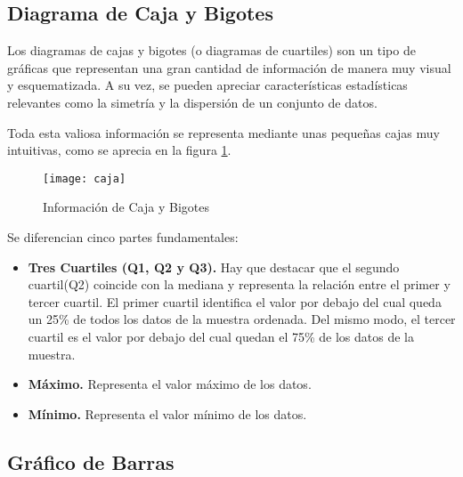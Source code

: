 \subsection{Diagrama de Caja y Bigotes}
Los diagramas de cajas y bigotes (o diagramas de cuartiles) son un tipo de gráficas que representan una gran cantidad de información de manera muy visual y esquematizada. A su vez, se pueden apreciar características estadísticas relevantes como la simetría y la dispersión de un conjunto de datos.

Toda esta valiosa información se representa mediante unas pequeñas cajas muy intuitivas, como se aprecia en la figura \ref{fig:caja}.

	
	\begin{figure}%
		\centering
		\texttt{[image: caja]}
		\caption{Información de Caja y Bigotes}\label{fig:caja}
	\end{figure}
	
Se diferencian cinco partes fundamentales: 
\begin{itemize}
	\item 
	\textbf{Tres Cuartiles (Q1, Q2 y Q3).} Hay que destacar que el segundo cuartil(Q2) coincide con la mediana y representa la relación entre el primer y tercer cuartil. El primer cuartil identifica el valor por debajo del cual queda un 25\% de todos los datos de la muestra ordenada. Del mismo modo, el tercer cuartil es el valor por debajo del cual quedan el 75\% de los datos de la muestra.
	\item 
	\textbf{Máximo.} Representa el valor máximo de los datos.
	\item 
	\textbf{Mínimo.} Representa el valor mínimo de los datos.
\end{itemize}

\subsection{Gráfico de Barras}
